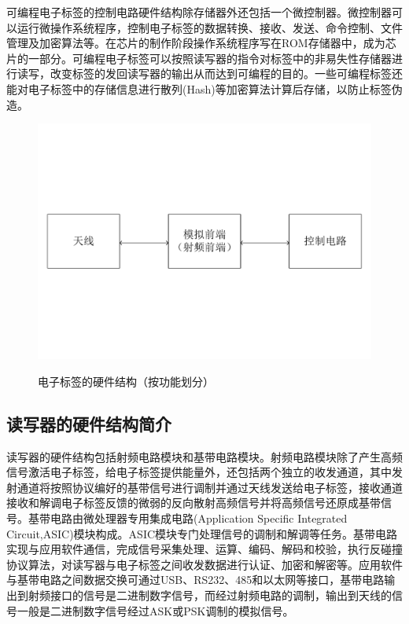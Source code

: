 \documentclass[a4paper]{ctexart}
\begin{document}
\begin{spacing}{1.5}
可编程电子标签的控制电路硬件结构除存储器外还包括一个微控制器。微控制器可以运行微操作系统程序，控制电子标签的数据转换、接收、发送、命令控制、文件管理及加密算法等。在芯片的制作阶段操作系统程序写在ROM存储器中，成为芯片的一部分。可编程电子标签可以按照读写器的指令对标签中的非易失性存储器进行读写，改变标签的发回读写器的输出从而达到可编程的目的\cite{RN99}。一些可编程标签还能对电子标签中的存储信息进行散列(Hash)等加密算法计算后存储，以防止标签伪造。
\begin{figure}
	\centering
	\includegraphics[width=\textwidth, keepaspectratio]{figure/RFID2-0.pdf}\\
	\caption{电子标签的硬件结构（按功能划分）}\label{f0}
\end{figure}

\subsection{读写器的硬件结构简介}
读写器的硬件结构包括射频电路模块和基带电路模块。射频电路模块除了产生高频信号激活电子标签，给电子标签提供能量外，还包括两个独立的收发通道，其中发射通道将按照协议编好的基带信号进行调制并通过天线发送给电子标签，接收通道接收和解调电子标签反馈的微弱的反向散射高频信号并将高频信号还原成基带信号。基带电路由微处理器专用集成电路(Application Specific Integrated Circuit,ASIC)模块构成。ASIC模块专门处理信号的调制和解调等任务。基带电路实现与应用软件通信，完成信号采集处理、运算、编码、解码和校验，执行反碰撞协议算法，对读写器与电子标签之间收发数据进行认证、加密和解密等。应用软件与基带电路之间数据交换可通过USB、RS232、485和以太网等接口，基带电路输出到射频接口的信号是二进制数字信号，而经过射频电路的调制，输出到天线的信号一般是二进制数字信号经过ASK或PSK调制的模拟信号。


\end{spacing}
\end{document}
